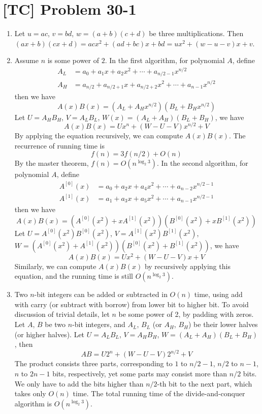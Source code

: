 \documentclass[a4paper,11pt,twocolumn]{article}
\begin{document}
  \section{[TC] Problem 30-1}
  \begin{enumerate}
    \item Let $u = ac$, $v = bd$, $w = (a+b)(c+d)$ be three multiplications. Then $(ax+b)(cx+d) = acx^2+(ad+bc)x+bd = ux^2 + (w-u-v)x+v$.
    \item Assume $n$ is some power of $2$. In the first algorithm, for polynomial $A$, define
      \begin{align*}
        A_{L} &= a_0 + a_1 x + a_2 x^2 + \cdots + a_{n/2-1}x^{n/2} \\
        A_{H} &= a_{n/2} + a_{n/2+1}x + a_{n/2+2}x^2 + \cdots + a_{n-1}x^{n/2}
      \end{align*}
      then we have
      $$ A(x)B(x) = (A_{L} + A_{H}x^{n/2})(B_{L} + B_{H}x^{n/2}) $$
      Let $U = A_{H}B_{H}$, $V = A_{L}B_{L}$, $W(x) = (A_L + A_H)(B_L + B_H)$, we have
      $$ A(x)B(x) = U x^n + (W-U-V)x^{n/2} + V$$
      By applying the equation recursively, we can compute $A(x)B(x)$. The recurrence of running time is
      $$ f(n) = 3f(n/2) + O(n)$$
      By the master theorem, $f(n) = O(n^{\log_2 3})$.
      In the second algorithm, for polynomial $A$, define
      \begin{align*}
        A^{[0]}(x) &= a_0 + a_2 x + a_4 x^2 + \cdots + a_{n-2} x^{n/2 - 1} \\
        A^{[1]}(x) &= a_1 + a_3 x + a_5 x^2 + \cdots + a_{n-1} x^{n/2 - 1}
      \end{align*}
      then we have
      $$ A(x)B(x) = (A^{[0]}(x^2) + xA^{[1]}(x^2))(B^{[0]}(x^2) + xB^{[1]}(x^2)) $$
      Let $U = A^{[0]}(x^2)B^{[0]}(x^2)$, $V = A^{[1]}(x^2)B^{[1]}(x^2)$, $W = (A^{[0]}(x^2) + A^{[1]}(x^2))(B^{[0]}(x^2) + B^{[1]}(x^2))$, we have
      $$ A(x)B(x) = U x^2 + (W-U-V)x + V $$
      Similarly, we can compute $A(x)B(x)$ by recursively applying this equation, and the running time is still $O(n^{\log_2 3})$.
    \item Two $n$-bit integers can be added or subtracted in $O(n)$ time, using add with carry (or subtract with borrow) from lower bit to higher bit. To avoid discussion of trivial details, let $n$ be some power of 2, by padding with zeros. Let $A$, $B$ be two $n$-bit integers, and $A_L$, $B_L$ (or $A_H$, $B_H$) be their lower halves (or higher halves). Let $U = A_LB_L$, $V = A_HB_H$, $W = (A_L+A_H)(B_L+B_H)$, then
        $$ AB = U 2^n + (W - U - V) 2^{n/2} + V $$
        The product consists three parts, corresponding to $1$ to $n/2-1$, $n/2$ to $n-1$, $n$ to $2n-1$ bits, respectively, yet some parts may consist more than $n/2$ bits. We only have to add the bits higher than $n/2$-th bit to the next part, which takes only $O(n)$ time. The total running time of the divide-and-conquer algorithm is $O(n^{\log_2 3})$.
  \end{enumerate}
\end{document}
